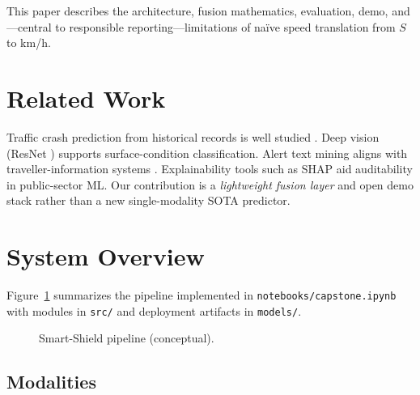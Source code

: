 \documentclass[11pt,a4paper]{article}
\begin{document}
This paper describes the architecture, fusion mathematics, evaluation, demo, and---central to responsible reporting---limitations of naïve speed translation from $S$ to km/h.

\section{Related Work}
\label{sec:related}

Traffic crash prediction from historical records is well studied \citep{bokonon2023traffic}. Deep vision (ResNet \citep{he2016resnet}) supports surface-condition classification. Alert text mining aligns with traveller-information systems \citep{ontario511}. Explainability tools such as SHAP \citep{lundberg2017shap} aid auditability in public-sector ML. Our contribution is a \emph{lightweight fusion layer} and open demo stack rather than a new single-modality SOTA predictor.

\section{System Overview}
\label{sec:system}

Figure~\ref{fig:pipeline} summarizes the pipeline implemented in \texttt{notebooks/capstone.ipynb} with modules in \texttt{src/} and deployment artifacts in \texttt{models/}.

\begin{figure}[ht]
  \centering
  \caption{Smart-Shield pipeline (conceptual).}
  \label{fig:pipeline}
\end{figure}

\subsection{Modalities}
\end{document}
